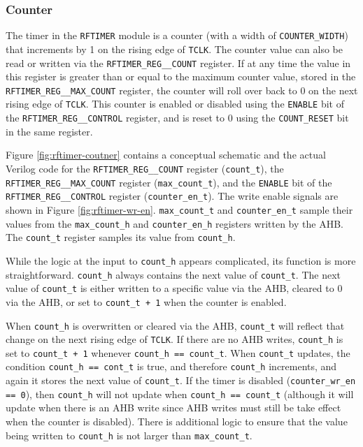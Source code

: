 \subsubsection{Counter}
The timer in the \texttt{RFTIMER} module is a counter (with a width of \texttt{COUNTER\_WIDTH}) that increments by 1 on the rising edge of \texttt{TCLK}. The counter value can also be read or written via the \texttt{RFTIMER\_REG\_\_COUNT} register. If at any time the value in this register is greater than or equal to the maximum counter value, stored in the \texttt{RFTIMER\_REG\_\_MAX\_COUNT} register, the counter will roll over back to 0 on the next rising edge of \texttt{TCLK}. This counter is enabled or disabled using the \texttt{ENABLE} bit of the \texttt{RFTIMER\_REG\_\_CONTROL} register, and is reset to 0 using the \texttt{COUNT\_RESET} bit in the same register.

Figure \ref{fig:rftimer-coutner} contains a conceptual schematic and the actual Verilog code for the \texttt{RFTIMER\_REG\_\_COUNT} register (\texttt{count\_t}), the \texttt{RFTIMER\_REG\_\_MAX\_COUNT} register (\texttt{max\_count\_t}), and the \texttt{ENABLE} bit of the \texttt{RFTIMER\_REG\_\_CONTROL} register (\texttt{counter\_en\_t}). The write enable signals are shown in Figure \ref{fig:rftimer-wr-en}. \texttt{max\_count\_t} and \texttt{counter\_en\_t} sample their values from the \texttt{max\_count\_h} and \texttt{counter\_en\_h} registers written by the AHB. The \texttt{count\_t} register samples its value from \texttt{count\_h}.

While the logic at the input to \texttt{count\_h} appears complicated, its function is more straightforward. \texttt{count\_h} always contains the next value of \texttt{count\_t}. The next value of \texttt{count\_t} is either written to a specific value via the AHB, cleared to 0 via the AHB, or set to \texttt{count\_t + 1} when the counter is enabled.

When \texttt{count\_h} is overwritten or cleared via the AHB, \texttt{count\_t} will reflect that change on the next rising edge of \texttt{TCLK}. If there are no AHB writes, \texttt{count\_h} is set to \texttt{count\_t + 1} whenever \texttt{count\_h == count\_t}. When \texttt{count\_t} updates, the condition \texttt{count\_h == cont\_t} is true, and therefore \texttt{count\_h} increments, and again it stores the next value of \texttt{count\_t}. If the timer is disabled (\texttt{counter\_wr\_en == 0}), then \texttt{count\_h} will not update when \texttt{count\_h == count\_t} (although it will update when there is an AHB write since AHB writes must still be take effect when the counter is disabled). There is additional logic to ensure that the value being written to \texttt{count\_h} is not larger than \texttt{max\_count\_t}.


